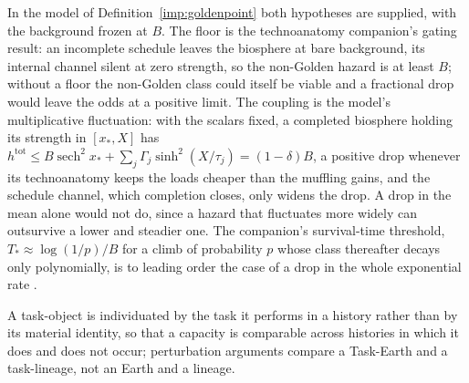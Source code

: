 \noindent In the model of Definition~\ref{imp:goldenpoint} both
hypotheses are supplied, with the background frozen at $B$. The floor is the technoanatomy companion's
gating result: an incomplete schedule leaves the biosphere at bare
background, its internal channel silent at zero strength, so the
non-Golden hazard is at least $B$; without a floor the non-Golden
class could itself be viable and a fractional drop would leave the odds
at a positive limit. The coupling is the model's multiplicative
fluctuation: with the scalars fixed, a completed biosphere holding its strength in $[x_\ast,X]$ has
$h^{\mathrm{tot}}\le B\operatorname{sech}^2x_\ast+\sum_j\Gamma_j\sinh^2(X/\tau_j)=(1-\delta)B$,
a positive drop whenever its technoanatomy keeps the loads cheaper than the muffling gains, and
the schedule channel, which completion closes, only widens the drop. A
drop in the mean alone would not do, since a hazard that fluctuates more
widely can outsurvive a lower and steadier one. The companion's
survival-time threshold, $T_\ast\approx\log(1/p)/B$ for a climb
of probability $p$ whose class thereafter decays only polynomially, is
to leading order the case of a drop in the whole exponential rate
\cite{GoldenTechnoanatomy}.

\begin{definition}
\label{imp:taskobject}
A task-object is individuated by the task it performs in a history rather
than by its material identity, so that a capacity is comparable across
histories in which it does and does not occur; perturbation arguments
compare a Task-Earth and a task-lineage, not an Earth and a lineage.
\end{definition}


